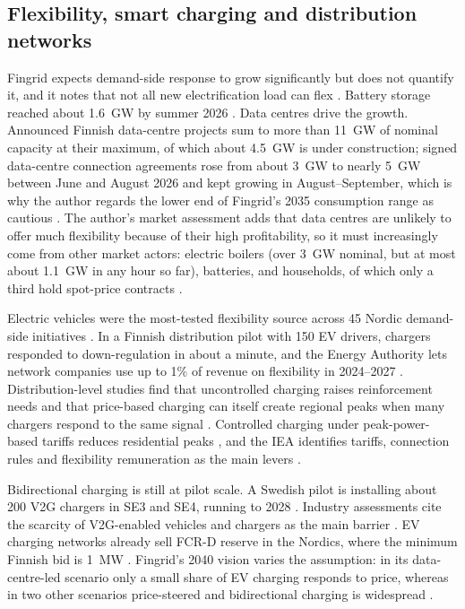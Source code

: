 \documentclass[11pt,a4paper]{article}
\begin{document}
\subsection{Flexibility, smart charging and distribution networks}
Fingrid expects demand-side response to grow significantly but does not quantify it, and it notes that not all new electrification load can flex \citep{fingrid2026prospects,fingrid2026q3}. Battery storage reached about 1.6~GW by summer 2026 \citep{fingrid2026prospects}. Data centres drive the growth. Announced Finnish data-centre projects sum to more than 11~GW of nominal capacity at their maximum, of which about 4.5~GW is under construction; signed data-centre connection agreements rose from about 3~GW to nearly 5~GW between June and August 2026 and kept growing in August--September, which is why the author regards the lower end of Fingrid's 2035 consumption range as cautious \citep{merilehto2026blog}. The author's market assessment adds that data centres are unlikely to offer much flexibility because of their high profitability, so it must increasingly come from other market actors: electric boilers (over 3~GW nominal, but at most about 1.1~GW in any hour so far), batteries, and households, of which only a third hold spot-price contracts \citep{merilehto2026blog}.

Electric vehicles were the most-tested flexibility source across 45 Nordic demand-side initiatives \citep{norden2025flex}. In a Finnish distribution pilot with 150 EV drivers, chargers responded to down-regulation in about a minute, and the Energy Authority lets network companies use up to 1\% of revenue on flexibility in 2024--2027 \citep{kemp2026enlit}. Distribution-level studies find that uncontrolled charging raises reinforcement needs and that price-based charging can itself create regional peaks when many chargers respond to the same signal \citep{lut2026charging,borenius2022scenarios}. Controlled charging under peak-power-based tariffs reduces residential peaks \citep{simolin2020}, and the IEA identifies tariffs, connection rules and flexibility remuneration as the main levers \citep{iea2022grid}.

Bidirectional charging is still at pilot scale. A Swedish pilot is installing about 200 V2G chargers in SE3 and SE4, running to 2028 \citep{vattenfall2026v2g}. Industry assessments cite the scarcity of V2G-enabled vehicles and chargers as the main barrier \citep{ey2025flex}. EV charging networks already sell FCR-D reserve in the Nordics, where the minimum Finnish bid is 1~MW \citep{virta2026fcrd}. Fingrid's 2040 vision varies the assumption: in its data-centre-led scenario only a small share of EV charging responds to price, whereas in two other scenarios price-steered and bidirectional charging is widespread \citep{fingrid2025vision}.
\end{document}
